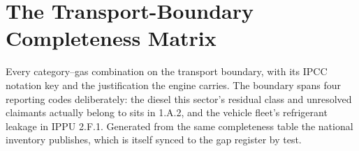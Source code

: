\section{The Transport-Boundary Completeness Matrix}
\label{app:completeness}

Every category--gas combination on the transport boundary, with its IPCC
notation key and the justification the engine carries. The boundary spans
four reporting codes deliberately: the diesel this sector's residual class
and unresolved claimants actually belong to sits in 1.A.2, and the vehicle
fleet's refrigerant leakage in IPPU 2.F.1. Generated from the same
completeness table the national inventory publishes, which is itself synced
to the gap register by test.

